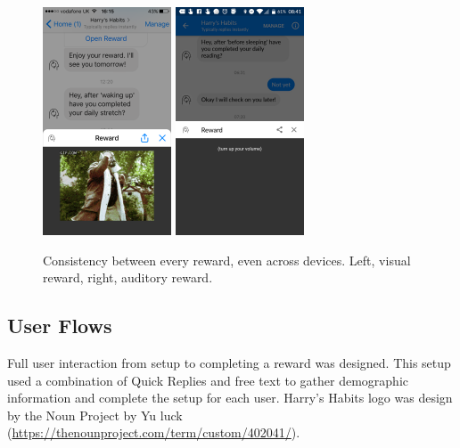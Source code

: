 \begin{figure}[H]
  \centering
  \includegraphics[width=1.5in]{../resources/design/reward-visual-2.png}
  \hspace{10px}
  \includegraphics[width=1.5in]{../resources/design/reward-audio.png}
  \caption{Consistency between every reward, even across devices. Left, visual reward, right, auditory reward.}
  \label{fig:rewards_consistency}
\end{figure}






\subsection{User Flows} \label{user_flow}
Full user interaction from setup to completing a reward was designed. This setup used a combination of Quick Replies and free text to gather demographic information and complete the setup for each user. Harry's Habits logo was design by the Noun Project by Yu luck (\url{https://thenounproject.com/term/custom/402041/}).

